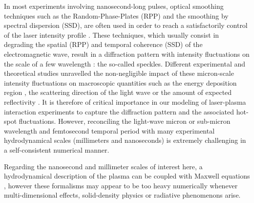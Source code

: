 \documentclass[%
 reprint,
 amsmath,amssymb,
 aps,
]{revtex4-1}
\begin{document}
In most experiments involving  nanosecond-long pulses, optical smoothing techniques  such as the Random-Phase-Plates (RPP) and the smoothing by spectral dispersion (SSD), are often used in order to reach a satisfactorily control of the laser intensity profile \cite{Kato_1984}.
These techniques, which usually  consist in degrading the spatial (RPP) and temporal coherence (SSD) of the electromagnetic wave,  result in a diffraction pattern  with intensity fluctuations on the scale of a few wavelength : the so-called speckles. 
Different experimental and theoretical studies unravelled the non-negligible impact of these micron-scale intensity fluctuations on macroscopic quantities such as the energy deposition region  \cite[]{POP_Delamater_1996,Huser_2009}, the scattering direction  of the light wave \cite{Epstein_1986,PRL_Moody_96,POP_Debayle_2018,POP_Duluc_2019,Yin_2019,POP_Huller_2020} or the amount of expected reflectivity \cite[]{POP_Laffite_2010,PRL_Rousseaux_2016,POP_Masson_2016,Glize_2017,Winjum_2019}.
It is therefore of critical importance in our modeling of laser-plasma interaction experiments to capture the diffraction pattern and the associated hot-spot fluctuations. 
However, reconciling the light-wave micron or sub-micron wavelength and  femtosecond temporal period with many experimental  hydrodynamical scales  (millimeters and nanoseconds) is extremely challenging in a self-consistent numerical manner. 

Regarding the nanosecond and millimeter scales of interest here, a hydrodynamical description of the plasma can be coupled with Maxwell equations \cite{Berger_1995,Still_2006,Loiseau_2006, Huller_2006}, however these  formalisms may appear to be  too heavy numerically whenever  multi-dimensional effects,  solid-density physics or radiative phenomenons arise.
\end{document}
